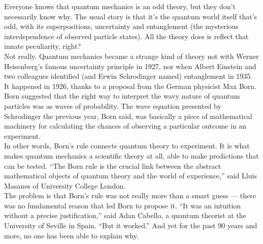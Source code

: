 \documentclass[12pt]{article}
\begin{document}
\noindent
Everyone knows that quantum mechanics is an odd theory, but they don't necessarily know why. The usual story is that it's the
quantum world itself that's odd, with its superpositions, uncertainty and entanglement (the mysterious interdependence of
observed particle states). All the theory does is reflect that innate peculiarity, right?\\

\noindent
Not really. Quantum mechanics became a strange kind of theory not with Werner Heisenberg's famous uncertainty principle in
1927, nor when Albert Einstein and two colleagues identified (and Erwin Schrodinger named) entanglement in 1935. It happened
in 1926, thanks to a proposal from the German physicist Max Born. Born suggested that the right way to interpret the wavy
nature of quantum particles was as waves of probability. The wave equation presented by Schrodinger the previous year, Born
said, was basically a piece of mathematical machinery for calculating the chances of observing a particular outcome in an
experiment.\\

\noindent
In other words, Born's rule connects quantum theory to experiment. It is what makes quantum mechanics a scientific theory at
all, able to make predictions that can be tested. ``The Born rule is the crucial link between the abstract mathematical objects of
quantum theory and the world of experience,'' said Lluis Masanes of University College London.\\

\noindent
The problem is that Born's rule was not really more than a smart guess --- there was no fundamental reason that led Born to
propose it. ``It was an intuition without a precise justification,'' said Adan Cabello, a quantum theorist at the University of Seville
in Spain. ``But it worked.'' And yet for the past 90 years and more, no one has been able to explain why.
\end{document}
